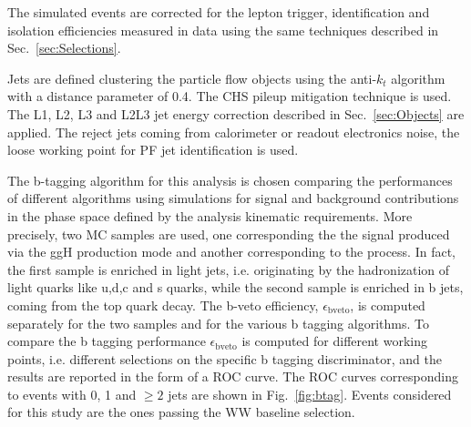 The simulated events are corrected for the lepton trigger, identification and isolation efficiencies measured in data using the same techniques described in Sec.~\ref{sec:Selections}.

Jets are defined clustering the particle flow objects using the anti-$k_t$ algorithm with a distance parameter of 0.4. The CHS pileup mitigation technique is used. The L1, L2, L3 and L2L3 jet energy correction described in Sec.~\ref{sec:Objects} are applied. The reject jets coming from calorimeter or readout electronics noise, the loose working point for PF jet identification is used.

The b-tagging algorithm for this analysis is chosen comparing the performances of different algorithms using simulations for signal and background contributions in the phase space defined by the analysis kinematic requirements. More precisely, two MC samples are used, one corresponding the the \hwwllnn signal produced via the ggH production mode and another corresponding to the \ttbar process. In fact, the first sample is enriched in light jets, i.e. originating by the hadronization of light quarks like u,d,c and s quarks, while the second sample is enriched in b jets, coming from the top quark decay. The b-veto efficiency, $\epsilon_\mathrm{b veto}$, is computed separately for the two samples and for the various b tagging algorithms. To compare the b tagging performance $\epsilon_\mathrm{b veto}$ is computed for different working points, i.e. different selections on the specific b tagging discriminator, and the results are reported in the form of a ROC curve. The ROC curves corresponding to events with 0, 1 and $\geq 2$ jets are shown in Fig.~\ref{fig:btag}. Events considered for this study are the ones passing the WW baseline selection.


